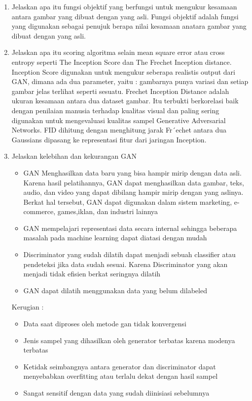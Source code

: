 \begin{enumerate}
    \item Jelaskan apa itu fungsi objektif yang berfungsi untuk mengukur kesamaan antara gambar yang dibuat dengan yang asli.
    \hfill\break
    Fungsi objektif adalah fungsi yang digunakan sebagai penujuk berapa nilai kesamaan anatara gambar yang dibuat dengan yang asli.

    \item Jelaskan apa itu scoring algoritma selain mean square error atau cross entropy seperti The Inception Score dan The Frechet Inception distance.
    \hfill\break
    Inception Score digunakan untuk mengukur seberapa realistis output dari GAN, dimana ada dua parameter, yaitu : gambarnya punya variasi dan setiap gambar jelas terlihat seperti sesuatu. Frechet Inception Distance adalah ukuran kesamaan antara dua dataset gambar. Itu terbukti berkorelasi baik dengan penilaian manusia terhadap kualitas visual dan paling sering digunakan untuk mengevaluasi kualitas sampel Generative Adversarial Networks. FID dihitung dengan menghitung jarak Fr´echet antara dua Gaussians dipasang ke representasi ﬁtur dari jaringan Inception.

    \item Jelaskan kelebihan dan kekurangan GAN
    \hfill\break
    \begin{itemize}
        \item GAN Menghasilkan data baru yang bisa hampir mirip dengan data asli. Karena hasil pelatihannya, GAN dapat menghasilkan data gambar, teks, audio, dan video yang dapat dibilang hampir mirip dengan yang aslinya. Berkat hal tersebut, GAN dapat digunakan dalam sistem marketing, e-commerce, games,iklan, dan industri lainnya
        \item GAN mempelajari representasi data secara internal sehingga beberapa masalah pada machine learning dapat diatasi dengan mudah
        \item Discriminator yang sudah dilatih dapat menjadi sebuah classifier atau pendeteksi jika data sudah sesuai. Karena Discriminator yang akan menjadi tidak efisien berkat seringnya dilatih
        \item GAN dapat dilatih menggunakan data yang belum dilabeled
    \end{itemize}
    Kerugian : \hfill \break
    \begin{itemize}
        \item Data saat diproses oleh metode gan tidak konvergensi
        \item Jenis sampel yang dihasilkan oleh generator terbatas karena modenya terbatas
        \item Ketidak seimbangnya antara generator dan discriminator dapat menyebabkan overfitting atau terlalu dekat dengan hasil sampel
        \item Sangat sensitif dengan data yang sudah diinisiasi sebelumnya
    \end{itemize}
\end{enumerate}

